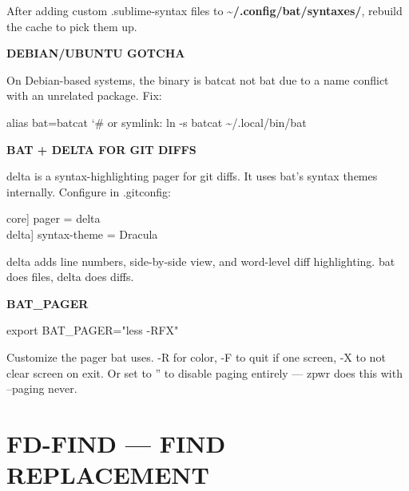 \documentclass[11pt,a4paper,twoside]{book}
\begin{document}
After adding custom .sublime-syntax files to \textbf{\textasciitilde{}/.config/bat/syntaxes/}, rebuild the cache to pick them up.


\vspace{12pt}
{\bfseries\color{neonyellow} DEBIAN/UBUNTU GOTCHA}\vspace{4pt}

On Debian-based systems, the binary is batcat not bat due to a name conflict with an unrelated package. Fix:

\begin{codebox}
\color{neongreen}alias bat=batcat     {\char`\#} or symlink: ln -s batcat \textasciitilde{}/.local/bin/bat\\
\end{codebox}


\vspace{12pt}
{\bfseries\color{neonyellow} BAT + DELTA FOR GIT DIFFS}\vspace{4pt}

delta is a syntax-highlighting pager for git diffs. It uses bat's syntax themes internally. Configure in .gitconfig:

\begin{codebox}
\color{neongreen}{[}core] pager = delta\\
\color{neongreen}{[}delta] syntax-theme = Dracula\\
\end{codebox}

delta adds line numbers, side-by-side view, and word-level diff highlighting. bat does files, delta does diffs.


\vspace{12pt}
{\bfseries\color{neonyellow} BAT\_PAGER}\vspace{4pt}

\begin{codebox}
\color{neongreen}export BAT\_PAGER="less -RFX"\\
\end{codebox}

Customize the pager bat uses. -R for color, -F to quit if one screen, -X to not clear screen on exit. Or set to '' to disable paging entirely — zpwr does this with --paging never.


\vspace{16pt}


\chapter{FD-FIND — FIND REPLACEMENT}
\end{document}
